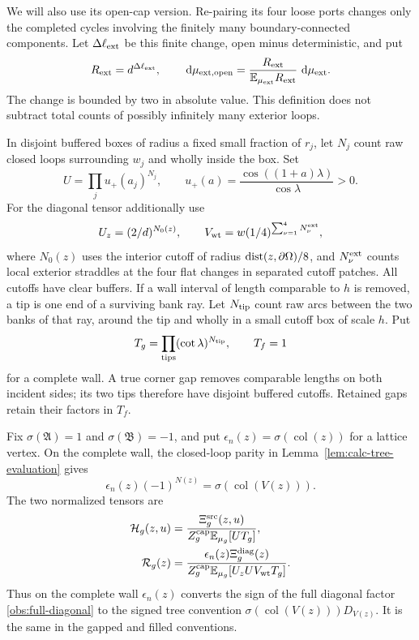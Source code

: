 We will also use its open-cap version.  Re-pairing its four loose
ports changes only the completed cycles involving the finitely
many boundary-connected components.  Let
$\Delta\ell_{\rm ext}$ be this finite change, open minus
deterministic, and put
\begin{equation}
 R_{\rm ext}=d^{\Delta\ell_{\rm ext}},\qquad
 \,\mathrm d\mu_{\rm ext,open}
 =\frac{R_{\rm ext}}{\mathbb E_{\mu_{\rm ext}}R_{\rm ext}}\,
       \,\mathrm d\mu_{\rm ext}.
 \label{obs:exterior-open-law}
\end{equation}
The change is bounded by two in absolute value.  This definition
does not subtract total counts of possibly infinitely many
exterior loops.

In disjoint buffered boxes of radius a fixed small fraction of $r_j$,
let $N_j$ count raw closed loops surrounding $w_j$ and wholly inside
the box.  Set
\begin{equation}
 U=\prod_j u_+(a_j)^{N_j},\qquad
 u_+(a)=\frac{\cos((1+a)\lambda)}{\cos\lambda}>0.
 \label{obs:distant-tilt}
\end{equation}
For the diagonal tensor additionally use
\begin{equation}
 U_z=(2/d)^{N_0(z)},\qquad
 V_{\rm wt}=w(1/4)^{\sum_{\nu=1}^4N_\nu^{\rm ext}},
 \label{obs:diagonal-tilts}
\end{equation}
where $N_0(z)$ uses the interior cutoff of radius
$\operatorname{dist}(z,\partial\Omega)/8$, and $N_\nu^{\rm ext}$ counts local
exterior straddles at the four flat changes in separated cutoff
patches.  All cutoffs have clear buffers.  If a wall interval of length
comparable to $h$ is removed, a tip is one end of a surviving bank ray.
Let $N_{\rm tip}$ count raw arcs between the two banks of that ray,
around the tip and wholly in a small cutoff box of scale $h$.  Put
\begin{equation}
 T_g=\prod_{\rm tips}(\cot\lambda)^{N_{\rm tip}},\qquad T_f=1
 \label{obs:tip-tilt}
\end{equation}
for a complete wall.  A true corner gap removes comparable lengths
on both incident sides; its two tips therefore have disjoint buffered
cutoffs.  Retained gaps retain their factors in $T_f$.

Fix $\sigma(\mathfrak A)=1$ and $\sigma(\mathfrak B)=-1$, and put
$\epsilon_n(z)=\sigma(\operatorname{col}(z))$ for a lattice vertex.
On the complete wall, the closed-loop parity in
Lemma~\ref{lem:calc-tree-evaluation} gives
\begin{equation}
 \epsilon_n(z)(-1)^{N(z)}
   =\sigma(\operatorname{col}(V(z))).
 \label{obs:parity-sign}
\end{equation}
The two normalized tensors are
\begin{align}
 \mathcal H_g(z,u)
 &=\frac{\Xi_g^{\rm src}(z,u)}
 {Z_g^{\rm cap}\mathbb E_{\mu_g}[UT_g]},
 \label{obs:source-normalization}\\
 \mathcal R_g(z)
 &=\frac{\epsilon_n(z)\Xi_g^{\rm diag}(z)}
 {Z_g^{\rm cap}\mathbb E_{\mu_g}[U_zUV_{\rm wt}T_g]}.
 \label{obs:residual-normalization}
\end{align}
Thus on the complete wall $\epsilon_n(z)$ converts the sign of the
full diagonal factor
\eqref{obs:full-diagonal} to the signed tree convention
$\sigma(\operatorname{col}(V(z)))D_{V(z)}$.  It is the same in the
gapped and filled conventions.


